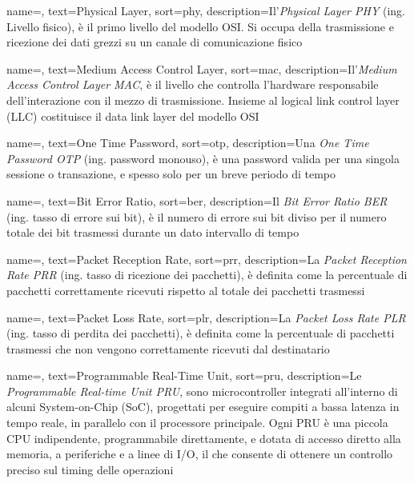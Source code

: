  {
    name=,
    text=Physical Layer,
    sort=phy,
    description={Il'\emph{Physical Layer PHY} (ing. Livello fisico), è il primo livello del modello OSI. Si occupa della trasmissione e ricezione dei dati grezzi su un canale di comunicazione fisico}
}

 {
    name=,
    text=Medium Access Control Layer,
    sort=mac,
    description={Il'\emph{Medium Access Control Layer MAC}, è il livello che controlla l'hardware responsabile dell'interazione con il mezzo di trasmissione. Insieme al logical link control layer (LLC) costituisce il data link layer del modello OSI}
}

 {
    name=,
    text=One Time Password,
    sort=otp,
    description={Una \emph{One Time Password OTP} (ing. password monouso), è una password valida per una singola sessione o transazione, e spesso solo per un breve periodo di tempo} 
}

 {
    name=,
    text=Bit Error Ratio,
    sort=ber,
    description={Il \emph{Bit Error Ratio BER} (ing. tasso di errore sui bit), è il numero di errore sui bit diviso per il numero totale dei bit trasmessi durante un dato intervallo di tempo}
}

 {
    name=,
    text=Packet Reception Rate,
    sort=prr,
    description={La \emph{Packet Reception Rate PRR} (ing. tasso di ricezione dei pacchetti), è definita come la percentuale di pacchetti correttamente ricevuti rispetto al totale dei pacchetti trasmessi}
}

 {
    name=,
    text=Packet Loss Rate,
    sort=plr,
    description={La \emph{Packet Loss Rate PLR} (ing. tasso di perdita dei pacchetti), è definita come la percentuale di pacchetti trasmessi che non vengono correttamente ricevuti dal destinatario}
}

 {
    name=,
    text=Programmable Real-Time Unit,
    sort=pru,
    description={Le \emph{Programmable Real-time Unit PRU}, sono microcontroller integrati all'interno di alcuni System-on-Chip (SoC), progettati per eseguire compiti a bassa latenza in tempo reale, in parallelo con il processore principale. Ogni PRU è una piccola CPU indipendente, programmabile direttamente, e dotata di accesso diretto alla memoria, a periferiche e a linee di I/O, il che consente di ottenere un controllo preciso sul timing delle operazioni}
}

